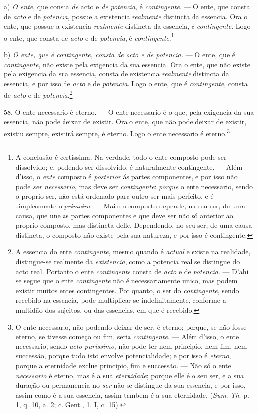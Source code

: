 a) \emph{O ente}, que consta \emph{de} acto e \emph{de potencia}, é \emph{contingente}. --- O ente, que consta de \emph{acto} e de \emph{potencia}, possue a existencia \emph{realmente} distincta da essencia. Ora o ente, que possue a existencia \emph{realmente} distincta da essencia, é \emph{contingente}. Logo o ente, que consta de \emph{acto} e de \emph{potencia}, é \emph{contingente}.\footnote{A conclusão é certissima. Na verdade, todo o ente composto pode ser dissolvido; e, podendo ser dissolvido, é naturalmente contingente. --- Além d'isso, o \emph{ente} composto é \emph{posterior} ás partes componentes, e por isso não pode \emph{ser necessario}, mas deve ser \emph{contingente}: \emph{porque} o ente necessario, sendo o proprio ser, não está ordenado para outro ser mais perfeito, e é simplesmente o \emph{primeiro}. --- Mais: o composto depende, no seu ser, de uma causa, que une as partes componentes e que deve ser não só anterior ao proprio composto, mas distincta delle. Dependendo, no seu ser, de uma causa distincta, o composto não existe pela sua natureza, e por isso é contingente.} 

b) \emph{O ente, que é contingente, consta de acto e de potencia.} --- O ente, que é \emph{contingente}, não existe pela exigencia da sua essencia. Ora o ente, que não existe pela exigencia da sua essencia, consta de existencia \emph{realmente} distincta da essencia, e por isso de \emph{acto} e de \emph{potencia}. Logo o ente, que é \emph{contingente}, consta de \emph{acto} e de \emph{potencia}.\footnote{A essencia do ente \emph{contingente}, mesmo quando é \emph{actual} e existe na realidade, distingue-se realmente da \emph{existencia}, como a potencia real se distingue do acto real. Portanto o ente \emph{contingente} consta de \emph{acto} e de \emph{potencia}. --- D'ahi se segue que o ente \emph{contingente} não é necessariamente unico, mas podem existir muitos entes contingentes. Por quanto, o ser do \emph{contingente}, sendo recebido na essencia, pode multiplicar-se indefinitamente, conforme a multidão dos sujeitos, ou das essencias, em que é recebido.}

58. O ente necessario é eterno. --- O ente necessario é o que, pela exigencia da sua essencia, não pode deixar de existir. Ora o ente, que não pode deixar de existir, existiu sempre, existirá sempre, é eterno. Logo o ente necessario é eterno.\footnote{O ente necessario, não podendo deixar de ser, é eterno; porque, se não fosse eterno, se tivesse começo ou fim, seria \emph{contingente}. --- Além d'isso, o ente necessario, sendo \emph{acto purissimo}, não pode ter nem principio, nem fim, nem successão, porque tudo isto envolve potencialidade; e por isso é \emph{eterno}, porque a eternidade exclue principio, fim e successão. --- Não só o ente \emph{necessario} é eterno, mas é a sua \emph{eternidade}; porque elle é o seu ser, e a sua duração ou permanencia no \emph{ser} não se distingue da sua essencia, e por isso, assim como é a sua essencia, assim tambem é a sua eternidade. (\emph{Sum}. \emph{Th}. p. 1, q. 10, a. 2; c. Gent., 1. I, c. 15).}

